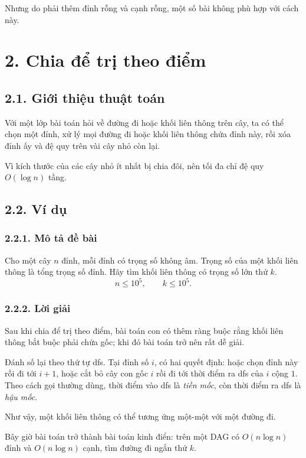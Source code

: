 \documentclass[11pt]{article}
\begin{document}
Nhưng do phải thêm đỉnh rỗng và cạnh rỗng, một số bài không phù hợp với cách
này.

\section*{2. Chia để trị theo điểm}

\subsection*{2.1. Giới thiệu thuật toán}

Với một lớp bài toán hỏi về đường đi hoặc khối liên thông trên cây, ta có thể
chọn một đỉnh, xử lý mọi đường đi hoặc khối liên thông chứa đỉnh này, rồi xóa
đỉnh ấy và đệ quy trên vài cây nhỏ còn lại.

Vì kích thước của các cây nhỏ ít nhất bị chia đôi, nên tối đa chỉ đệ quy
\(O(\log n)\) tầng.

\subsection*{2.2. Ví dụ}

\subsubsection*{2.2.1. Mô tả đề bài}

Cho một cây \(n\) đỉnh, mỗi đỉnh có trọng số không âm. Trọng số của một khối
liên thông là tổng trọng số đỉnh. Hãy tìm khối liên thông có trọng số lớn thứ
\(k\).
\[
  n\le10^5,\qquad k\le10^5.
\]

\subsubsection*{2.2.2. Lời giải}

Sau khi chia để trị theo điểm, bài toán con có thêm ràng buộc rằng khối liên
thông bắt buộc phải chứa gốc; khi đó bài toán trở nên rất dễ giải.

Đánh số lại theo thứ tự dfs. Tại đỉnh số \(i\), có hai quyết định: hoặc chọn
đỉnh này rồi đi tới \(i+1\), hoặc cắt bỏ cây con gốc \(i\) rồi đi tới thời
điểm ra dfs của \(i\) cộng \(1\). Theo cách gọi thường dùng, thời điểm vào dfs
là \emph{tiền mốc}, còn thời điểm ra dfs là \emph{hậu mốc}.

Như vậy, một khối liên thông có thể tương ứng một-một với một đường đi.

Bây giờ bài toán trở thành bài toán kinh điển: trên một DAG có
\(O(n\log n)\) đỉnh và \(O(n\log n)\) cạnh, tìm đường đi ngắn thứ \(k\).
\end{document}
